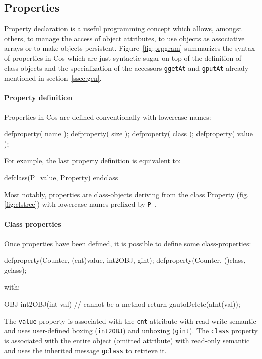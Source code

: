 \documentclass[preprint,10pt]{sigplanconf}
\newcommand{\ProgLang}[1]{{\sc #1}\xspace}
\newcommand{\Cos}       {\ProgLang{Cos}}
\newcommand{\code}[1]{\lstinline[language=COS,style=samplecode]|#1|}
\begin{document}
\subsection{Properties\label{ssec:prp}}

Property declaration is a useful programming concept which allows, amongst others, to manage the access of object attributes, to use objects as associative arrays or to make objects persistent. Figure~\ref{fig:prpgram} summarizes the syntax of properties in \Cos which are just syntactic sugar on top of the definition of class-objects and the specialization of the accessors \code{ggetAt} and \code{gputAt} already mentioned in section~\ref{ssec:gen}.

\paragraph{Property definition}

Properties in \Cos are defined conventionally with lowercase names:
\begin{COS}
defproperty( name );
defproperty( size );
defproperty( class );
defproperty( value );
\end{COS}
For example, the last property definition is equivalent to:
\begin{COS}
defclass(P_value, Property)
endclass
\end{COS}
Most notably, properties are class-objects deriving from the class Property (fig. \ref{fig:clstree}) with lowercase names prefixed by \code{P_}.

\paragraph{Class properties}

Once properties have been defined, it is possible to define some class-properties:
\begin{COS}
defproperty(Counter, (cnt)value, int2OBJ, gint);
defproperty(Counter, ()class, gclass);
\end{COS}
\vspace{-1.2mm}with:\vspace{-0.9mm}
\begin{COS}
OBJ int2OBJ(int val) { // cannot be a method
  return gautoDelete(aInt(val));
}
\end{COS}
The \code{value} property is associated with the \code{cnt} attribute with read-write semantic and uses user-defined boxing (\code{int2OBJ}) and unboxing (\code{gint}). The \code{class} property is associated with the entire object (omitted attribute) with read-only semantic and uses the inherited message \code{gclass} to retrieve it.
\end{document}
